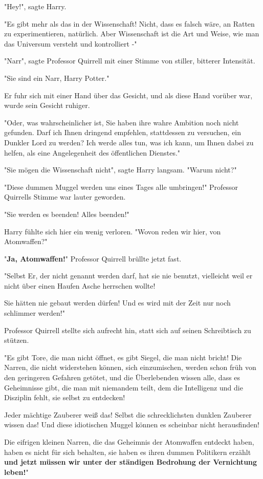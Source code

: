 {"Hey!", sagte Harry.

"Es gibt mehr als das in der Wissenschaft! Nicht, dass es falsch wäre, an Ratten zu experimentieren, natürlich. Aber Wissenschaft ist die Art und Weise, wie man das Universum versteht und kontrolliert -"

"Narr", sagte Professor Quirrell mit einer Stimme von stiller, bitterer Intensität.

"Sie sind ein Narr, Harry Potter."

Er fuhr sich mit einer Hand über das Gesicht, und als diese Hand vorüber war, wurde sein Gesicht ruhiger.

"Oder, was wahrscheinlicher ist, Sie haben ihre wahre Ambition noch nicht gefunden. Darf ich Ihnen dringend empfehlen, stattdessen zu versuchen, ein Dunkler Lord zu werden? Ich werde alles tun, was ich kann, um Ihnen dabei zu helfen, als eine Angelegenheit des öffentlichen Dienstes."

"Sie mögen die Wissenschaft nicht", sagte Harry langsam. "Warum nicht?"

"Diese dummen Muggel werden uns eines Tages alle umbringen!" Professor Quirrells Stimme war lauter geworden.

"Sie werden es beenden! Alles beenden!"

Harry fühlte sich hier ein wenig verloren. "Wovon reden wir hier, von Atomwaffen?"

"\textbf{Ja, Atomwaffen!}" Professor Quirrell brüllte jetzt fast.

"Selbst Er, der nicht genannt werden darf, hat sie nie benutzt, vielleicht weil er nicht über einen Haufen Asche herrschen wollte!

Sie hätten nie gebaut werden dürfen! Und es wird mit der Zeit nur noch schlimmer werden!"

Professor Quirrell stellte sich aufrecht hin, statt sich auf seinen Schreibtisch zu stützen.

"Es gibt Tore, die man nicht öffnet, es gibt Siegel, die man nicht bricht! Die Narren, die nicht widerstehen können, sich einzumischen, werden schon früh von den geringeren Gefahren getötet, und die Überlebenden wissen alle, dass es Geheimnisse gibt, die man mit niemandem teilt, dem die Intelligenz und die Disziplin fehlt, sie selbst zu entdecken!

Jeder mächtige Zauberer weiß das! Selbst die schrecklichsten dunklen Zauberer wissen das! Und diese idiotischen Muggel können es scheinbar nicht herausfinden!

Die eifrigen kleinen Narren, die das Geheimnis der Atomwaffen entdeckt haben, haben es nicht für sich behalten, sie haben es ihren dummen Politikern erzählt \textbf{und jetzt müssen wir unter der ständigen Bedrohung der Vernichtung leben!}"

}
